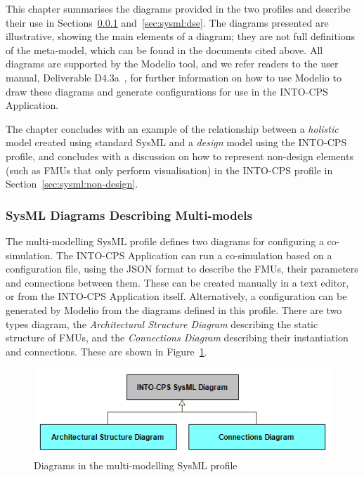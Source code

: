 This chapter summarises the diagrams provided in the two profiles and describe their use in Sections~\ref{sec:sysml:intocps} and~\ref{sec:sysml:dse}. The diagrams presented are illustrative, showing the main elements of a diagram; they are not full definitions of the meta-model, which can be found in the documents cited above. All diagrams are supported by the Modelio tool, and we refer readers to the user manual, Deliverable D4.3a~\cite{INTOCPSD4.3a}, for further information on how to use Modelio to draw these diagrams and generate configurations for use in the INTO-CPS Application.

The chapter concludes with an example of the relationship between a \emph{holistic} model created using standard SysML and a \emph{design} model using the INTO-CPS profile, and concludes with a discussion on how to represent non-design elements (such as FMUs that only perform visualisation) in the INTO-CPS profile in Section~\ref{sec:sysml:non-design}.

\subsubsection{SysML Diagrams Describing Multi-models}
\label{sec:sysml:intocps}

The multi-modelling SysML profile defines two diagrams for configuring a co-simulation. The INTO-CPS Application can run a co-simulation based on a configuration file, using the JSON format to describe the FMUs, their parameters and connections between them. These can be created manually in a text editor, or from the INTO-CPS Application itself. Alternatively, a configuration can be generated by Modelio from the diagrams defined in this profile. There are two types diagram, the \emph{Architectural Structure Diagram} describing the static structure of FMUs, and the \emph{Connections Diagram} describing their instantiation and connections. These are shown in Figure~\ref{fig:sysml:intocps}.

\begin{figure}[h!]
\centering
\includegraphics[scale=0.6]{figures/Architecting/ArchitecturalViews}
\caption{Diagrams in the multi-modelling SysML profile}
\label{fig:sysml:intocps}
\end{figure}

